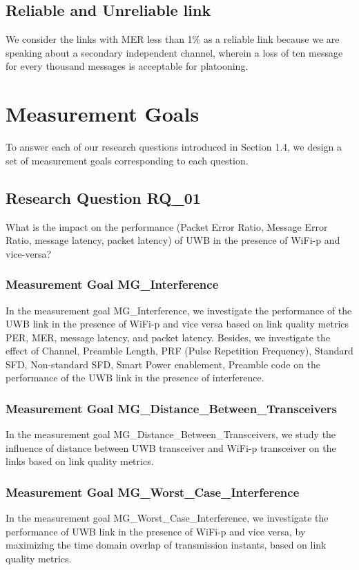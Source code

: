 \subsection{Reliable and Unreliable link}
We consider the links with MER less than 1\% as a reliable link because we are speaking about a secondary independent channel, wherein a loss of ten message for every thousand messages is acceptable for platooning.

\section{Measurement Goals}
To answer each of our research questions introduced in Section 1.4, we design a set of measurement goals corresponding to each question.

\subsection{Research Question RQ\_01}
What is the impact on the performance (Packet Error Ratio, Message Error Ratio, message latency, packet latency) of UWB in the presence of WiFi-p and vice-versa?

\subsubsection{Measurement Goal MG\_Interference}
In the measurement goal MG\_Interference, we investigate the performance of the UWB link in the presence of WiFi-p and vice versa based on link quality metrics PER, MER, message latency, and packet latency. Besides, we investigate the effect of Channel, Preamble Length, PRF (Pulse Repetition Frequency), Standard SFD, Non-standard SFD, Smart Power enablement, Preamble code on the performance of the UWB link in the presence of interference.

\subsubsection{Measurement Goal MG\_Distance\_Between\_Transceivers}
In the measurement goal MG\_Distance\_Between\_Transceivers, we study the influence of distance between UWB transceiver and WiFi-p transceiver on the links based on link quality metrics.


\subsubsection{Measurement Goal MG\_Worst\_Case\_Interference}
In the measurement goal MG\_Worst\_Case\_Interference, we investigate the performance of UWB link in the presence of WiFi-p and vice versa, by maximizing the time domain overlap of transmission instants, based on link quality metrics.

